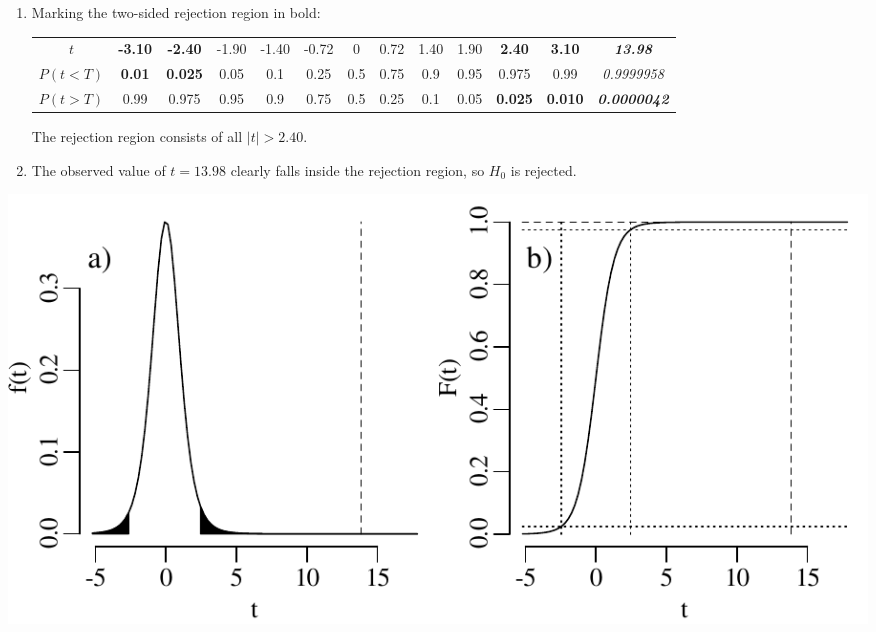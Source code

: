 \begin{enumerate}
\item Marking the two-sided rejection region in bold:
  
  \begin{center}
    \begin{tabular}{c|c@{\gap}c@{\gap}c@{\gap}c@{\gap}
        c@{\gap}c@{\gap}c@{\gap}c@{\gap}c@{\gap}c@{\gap}c@{\gap}c}
      $t$ & \textbf{-3.10} & \textbf{-2.40} & -1.90 & -1.40 & -0.72 &
      0 & 0.72 & 1.40 & 1.90 & \textbf{2.40} &
      \textbf{3.10} & \textbf{\emph{13.98}}\\
      $P(t<T)$ & \textbf{0.01} & \textbf{0.025} & 0.05 & 0.1 & 0.25 &
      0.5 & 0.75 & 0.9 & 0.95 & 0.975 & 0.99 & \emph{0.9999958}\\
      $P(t>T)$ & 0.99 & 0.975 & 0.95 & 0.9 & 0.75 & 0.5 &
      0.25 & 0.1 & 0.05 & \textbf{0.025} & \textbf{0.010} &
      \textbf{\emph{0.0000042}}
    \end{tabular}
  \end{center}

  The rejection region consists of all $|t|>{2.40}$.

\item The observed value of $t=13.98$ clearly falls inside the
  rejection region, so $H_0$ is rejected.
  
\end{enumerate}

\noindent\begin{minipage}[t][][b]{.6\textwidth}
  \includegraphics[width=\textwidth]{../figures/tr.pdf}\\
\end{minipage}
\begin{minipage}[t][][t]{.4\textwidth}
  \label{fig:tr}
\end{minipage}

